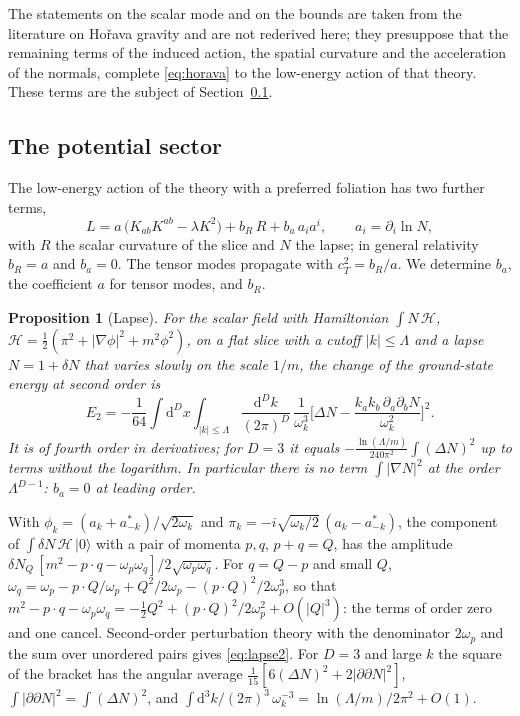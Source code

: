 \documentclass[11pt,a4paper]{article}
\makeatletter
\theoremstyle{stmt}
\newtheorem{proposition}[theorem]{Proposition}
\theoremstyle{defn}
\theoremstyle{rmk}
\renewenvironment{proof}[1][\proofname]{\par\pushQED{\qed}\normalfont\topsep6\p@\@plus6\p@\relax
  \trivlist\item[\hskip\labelsep{\sffamily\itshape\small #1.}]\ignorespaces}{\popQED\endtrivlist\@endpefalse}
\numberwithin{equation}{section}
\newcommand{\dd}{\mathrm{d}}
\makeatother
\begin{document}
The statements on the scalar mode and on the bounds are taken from the literature on Ho\v{r}ava gravity and are not rederived here; they presuppose that the remaining terms of the induced action, the spatial curvature and the acceleration of the normals, complete \eqref{eq:horava} to the low-energy action of that theory. These terms are the subject of Section~\ref{sec:potential}.

\subsection{The potential sector}\label{sec:potential}

The low-energy action of the theory with a preferred foliation has two further terms,
\begin{equation}\label{eq:potential}
L=a\,\big(K_{ab}K^{ab}-\lambda K^2\big)+b_R\,R+b_a\,a_ia^i,\qquad a_i=\partial_i\ln N,
\end{equation}
with $R$ the scalar curvature of the slice and $N$ the lapse; in general relativity $b_R=a$ and $b_a=0$. The tensor modes propagate with $c_T^2=b_R/a$. We determine $b_a$, the coefficient $a$ for tensor modes, and $b_R$.

\begin{proposition}[Lapse]\label{prop:lapseresponse}
For the scalar field with Hamiltonian $\int N\,\mathcal H$, $\mathcal H=\tfrac12(\pi^2+|\nabla\phi|^2+m^2\phi^2)$, on a flat slice with a cutoff $|k|\le\Lambda$ and a lapse $N=1+\delta N$ that varies slowly on the scale $1/m$, the change of the ground-state energy at second order is
\begin{equation}\label{eq:lapse2}
E_2=-\frac1{64}\int\dd^Dx\int_{|k|\le\Lambda}\frac{\dd^Dk}{(2\pi)^D}\,\frac1{\omega_k^3}\Big[\Delta N-\frac{k_ak_b\,\partial_a\partial_bN}{\omega_k^2}\Big]^2 .
\end{equation}
It is of fourth order in derivatives; for $D=3$ it equals $-\frac{\ln(\Lambda/m)}{240\pi^2}\int(\Delta N)^2$ up to terms without the logarithm. In particular there is no term $\int|\nabla N|^2$ at the order $\Lambda^{D-1}$: $b_a=0$ at leading order.
\end{proposition}

\begin{proof}
With $\phi_k=(a_k+a_{-k}^*)/\sqrt{2\omega_k}$ and $\pi_k=-i\sqrt{\omega_k/2}\,(a_k-a_{-k}^*)$, the component of $\int\delta N\,\mathcal H\,|0\rangle$ with a pair of momenta $p,q$, $p+q=Q$, has the amplitude $\delta N_Q\,[m^2-p\cdot q-\omega_p\omega_q]/2\sqrt{\omega_p\omega_q}$. For $q=Q-p$ and small $Q$, $\omega_q=\omega_p-p\cdot Q/\omega_p+Q^2/2\omega_p-(p\cdot Q)^2/2\omega_p^3$, so that $m^2-p\cdot q-\omega_p\omega_q=-\tfrac12Q^2+(p\cdot Q)^2/2\omega_p^2+O(|Q|^3)$: the terms of order zero and one cancel. Second-order perturbation theory with the denominator $2\omega_p$ and the sum over unordered pairs gives \eqref{eq:lapse2}. For $D=3$ and large $k$ the square of the bracket has the angular average $\tfrac1{15}[6(\Delta N)^2+2|\partial\partial N|^2]$, $\int|\partial\partial N|^2=\int(\Delta N)^2$, and $\int\dd^3k/(2\pi)^3\,\omega_k^{-3}=\ln(\Lambda/m)/2\pi^2+O(1)$.
\end{proof}
\end{document}
